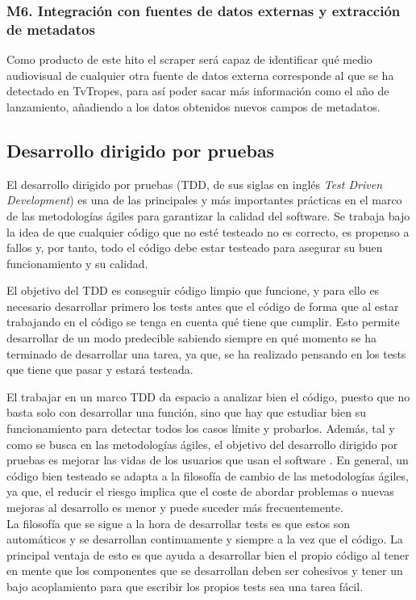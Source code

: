 \subsubsection{M6. Integración con fuentes de datos externas y extracción de metadatos}
Como producto de este hito el scraper será capaz de identificar qué medio
audiovisual de cualquier otra fuente de datos externa corresponde al que se ha
detectado en TvTropes, para así poder sacar más información como el año de
lanzamiento, añadiendo a los datos obtenidos nuevos campos de metadatos.

\subsection{Desarrollo dirigido por pruebas}
El desarrollo dirigido por pruebas (TDD, de sus siglas en inglés \textit{Test
Driven Development}) es una de las principales y más importantes prácticas en el
marco de las metodologías ágiles para garantizar la calidad del software. Se
trabaja bajo la idea de que cualquier código que no esté testeado no es
correcto, es propenso a fallos y, por tanto, todo el código debe estar testeado
para asegurar su buen funcionamiento y su calidad.

El objetivo del TDD es conseguir código limpio que funcione, y para ello es
necesario desarrollar primero los tests antes que el código de forma que al
estar trabajando en el código se tenga en cuenta qué tiene que cumplir. Esto
permite desarrollar de un modo predecible sabiendo siempre en qué momento se ha
terminado de desarrollar una tarea, ya que, se ha realizado pensando en los
tests que tiene que pasar y estará testeada. 

El trabajar en un marco TDD da espacio a analizar bien el código, puesto que no
basta solo con desarrollar una función, sino que hay que estudiar bien su
funcionamiento para detectar todos los casos límite y probarlos. Además, tal y
como se busca en las metodologías ágiles, el objetivo del desarrollo dirigido
por pruebas es mejorar las vidas de los usuarios que usan el software
\cite{beck2002driven}. En general, un código bien testeado se adapta a la
filosofía de cambio de las metodologías ágiles, ya que, el reducir el riesgo
implica que el coste de abordar problemas o nuevas mejoras al desarrollo es
menor y puede suceder más frecuentemente.\\

La filosofía que se sigue a la hora de desarrollar tests es que estos son
automáticos y se desarrollan continuamente y siempre a la vez que el código. La
principal ventaja de esto es que ayuda a desarrollar bien el propio código al
tener en mente que los componentes que se desarrollan deben ser cohesivos y
tener un bajo acoplamiento para que escribir los propios tests sea una tarea
fácil.


